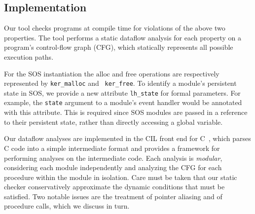 % 
% 
% 


\subsection{Implementation}

Our tool checks programs at compile time for violations of the above
two properties.  The tool performs a static dataflow analysis for each
property on a program's control-flow graph (CFG), which statically
represents all possible execution paths.  

For the SOS instantiation the $\mathrm{alloc}$ and $\mathrm{free}$
operations are respectively represented by {\tt ker\_malloc} and {\tt
ker\_free}.  To identify a module's persistent state in SOS, we
provide a new attribute {\tt lh\_state} for formal parameters.  For
example, the {\tt state} argument to a module's event handler would be
annotated with this attribute.  This is required since SOS modules are
passed in a reference to their persistent state, rather than directly accessing a
global variable.

Our dataflow analyses are implemented in the CIL front end for
C~\cite{CIL}, which parses C code into a simple intermediate format
and provides a framework for performing analyses on the intermediate
code.  Each analysis is {\em modular}, considering each module
independently and analyzing the CFG for each procedure within the
module in isolation.  Care must be taken that our static checker
conservatively approximate the dynamic conditions that must be
satisfied.  Two notable issues are the treatment of pointer aliasing
and of procedure calls, which we discuss in turn.

